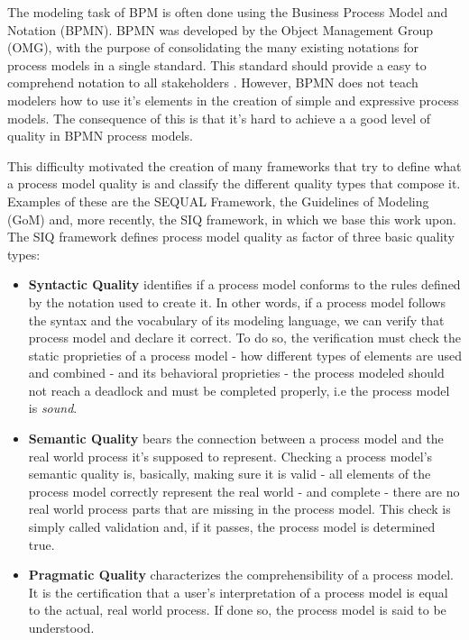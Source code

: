 \documentclass[a4paper,twoside]{article}
\begin{document}
\noindent The modeling task of BPM is often done using the Business Process Model and Notation (BPMN). BPMN was developed by the Object Management Group (OMG), with the purpose of consolidating the many existing notations for process models in a single standard. This standard should provide a easy to comprehend notation to all stakeholders \cite{OMGObjectManagementGroup2015}. However, BPMN does not teach modelers how to use it's elements in the creation of simple and expressive process models. The consequence of this is that it's hard to achieve a a good level of quality in BPMN process models.


This difficulty motivated the creation of many frameworks that try to define what a process model quality is and classify the different quality types that compose it. Examples of these are the SEQUAL Framework, the Guidelines of Modeling (GoM) and, more recently, the SIQ framework, in which we base this work upon. The SIQ framework defines process model quality as factor of three basic quality types:

\begin{itemize}
	\item \textbf{Syntactic Quality} identifies if a process model conforms to the rules defined by the notation used to create it. In other words, if a process model follows the syntax and the vocabulary of its modeling language, we can verify that process model and declare it correct. To do so, the verification must check the static proprieties of a process model - how different types of elements are used and combined - and its behavioral proprieties - the process modeled should not reach a deadlock and must be completed properly, i.e the process model is \textit{sound}.
	\item \textbf{Semantic Quality} bears the connection between a process model and the real world process it's supposed to represent. Checking a process model's semantic quality is, basically, making sure it is valid - all elements of the process model correctly represent the real world - and complete - there are no real world process parts that are missing in the process model. This check is simply called validation and, if it passes, the process model is determined true.
	\item \textbf{Pragmatic Quality} characterizes the comprehensibility of a process model. It is the certification that a user's interpretation of a process model is equal to the actual, real world process. If done so, the process model is said to be understood.
\end{itemize}
\end{document}
